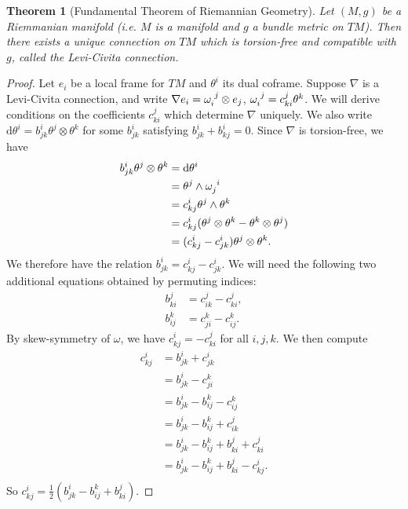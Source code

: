 \documentclass{book}
\renewcommand{\d}{\mathrm{d}}
\newtheorem{theorem}{Theorem}[section]
\theoremstyle{definition}
\numberwithin{equation}{section}
\begin{document}
\begin{theorem}[Fundamental Theorem of Riemannian Geometry]
    Let $(M,g)$ be a Riemmanian manifold (i.e. $M$ is a manifold and $g$ a bundle metric on $TM$). Then there exists a unique connection on $TM$ which is torsion-free and compatible with $g$, called the \textit{Levi-Civita connection}.
\end{theorem}
\begin{proof}
    Let $e_i$ be a local frame for $TM$ and $\theta^i$ its dual coframe. Suppose $\nabla$ is a Levi-Civita connection, and write $\nabla e_i = \tensor{\omega}{_i^j} \otimes e_j$, $\tensor{\omega}{_i^j} = c_{ki}^j \theta^k$. We will derive conditions on the coefficients $c_{ki}^j$ which determine $\nabla$ uniquely. We also write $\d\theta^i = b_{jk}^i \theta^j \otimes \theta^k$ for some $b_{jk}^i$ satisfying $b_{jk}^i + b_{kj}^i = 0$. Since $\nabla$ is torsion-free, we have 
    \begin{equation} \begin{aligned}
        b_{jk}^i \theta^j \otimes \theta^k &= \d\theta^i \\
                                           &= \theta^j \wedge \tensor{\omega}{_j^i} \\
                                           &= c_{kj}^i \theta^j \wedge \theta^k \\
                                           &= c_{kj}^i (\theta^j \otimes \theta^k - \theta^k \otimes \theta^j) \\
                                           &= (c_{kj}^i - c_{jk}^i) \theta^j \otimes \theta^k.
    \end{aligned} \end{equation}
    We therefore have the relation $b_{jk}^i = c_{kj}^i - c_{jk}^i$. We will need the following two additional equations obtained by permuting indices:
    \begin{equation} \begin{aligned}
        b_{ki}^j &= c_{ik}^j - c_{ki}^j, \\
        b_{ij}^k &= c_{ji}^k - c_{ij}^k.
    \end{aligned} \end{equation}
    By skew-symmetry of $\omega$, we have $c_{kj}^i = - c_{ki}^j$ for all $i,j,k$. We then compute
    \begin{equation} \begin{aligned}
        c_{kj}^i &= b_{jk}^i + c_{jk}^i \\
                 &= b_{jk}^i - c_{ji}^k \\
                 &= b_{jk}^i - b_{ij}^k - c_{ij}^k \\ 
                 &= b_{jk}^i - b_{ij}^k + c_{ik}^j \\
                 &= b_{jk}^i - b_{ij}^k + b_{ki}^j + c_{ki}^j \\
                 &= b_{jk}^i - b_{ij}^k + b_{ki}^j - c_{kj}^i. \\
    \end{aligned} \end{equation}
    So $c_{kj}^i = \frac{1}{2} (b_{jk}^i - b_{ij}^k + b_{ki}^j)$.
\end{proof}
\end{document}
